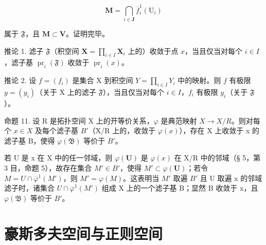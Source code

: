 \[
\mathbf {M} = \bigcap_ {i \in \mathbf {J}} \overline {{f}} _ {i} ^ {1} (\mathrm{U} _ {i})
\]

属于 \(\mathfrak{F}\)，且 \(\mathbf{M} \subset \mathbf{V}\)。证明完毕。

推论 1. 滤子 \(\mathfrak{F}\)（积空间 \(\mathbf{X} = \prod_{i\in I}\mathbf{X}_i\) 上的）收敛于点 \(x\)，当且仅当对每个 \(i\in I\)，滤子基 \(\operatorname{pr}_{i}(\mathfrak{F})\) 收敛于 \(\operatorname{pr}_{i}(x)\)。

推论 2. 设 \(f = (f_{i})\) 是集合 X 到积空间 \(Y = \prod_{i \in I} Y_{i}\) 中的映射。则 \(f\) 有极限 \(y = (y_{i})\)（关于 X 上的滤子 \(\mathfrak{F}\)），当且仅当对每个 \(i \in I\)，\(f_{i}\) 有极限 \(y_{i}\)（关于 \(\mathfrak{F}\)）。

命题 11. 设 R 是拓扑空间 X 上的开等价关系，\(\varphi\) 是典范映射 \(X \rightarrow X/R\)。则对每个 \(x \in X\) 及每个滤子基 \(B'\)（X/R 上的，收敛于 \(\varphi(x)\)），存在 X 上收敛于 x 的滤子基 B，使得 \(\varphi(\mathfrak{B})\) 等价于 \(B'\)。

若 U 是 x 在 X 中的任一邻域，则 \(\varphi(\mathbf{U})\) 是 \(\varphi(x)\) 在 X/R 中的邻域（§ 5，第 3 目，命题 5），故存在集合 \(M' \in B'\)，使得 \(M' \subset \varphi(\mathbf{U})\)；若令 \(M = U \cap \overline{\varphi}^{1}(M')\)，则 \(M' = \varphi(M)\)。这表明当 \(M'\) 取遍 \(B'\) 且 U 取遍 x 的邻域滤子时，诸集合 \(U \cap \overline{\varphi}^{1}(M')\) 组成 X 上的一个滤子基 B；显然 B 收敛于 x，且 \(\varphi(\mathfrak{B})\) 等价于 \(B'\)。

\section{豪斯多夫空间与正则空间}
